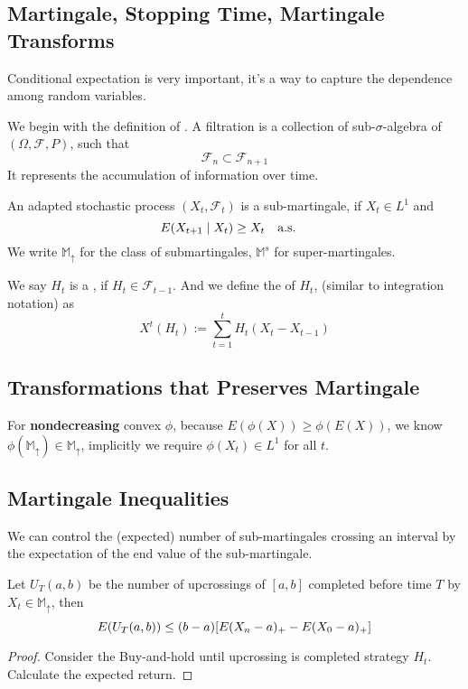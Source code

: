 \subsection{Martingale, Stopping Time, Martingale Transforms}

Conditional expectation is very important, it's a way to capture the dependence among random variables.

We begin with the definition of . A filtration is a collection of sub-\(\sigma\)-algebra of \((\Omega, \mathcal{F}, P)\), such that 
\begin{equation*}
    \mathcal{F}_{n} \subset \mathcal{F}_{n+1}
\end{equation*}
It represents the accumulation of information over time. 

\begin{defn}[Martingales]
    An adapted stochastic process \((X_{t}, \mathcal{F}_{t})\) is a sub-martingale, if \(X_{t} \in L^{1}\) and 
    \begin{equation*}
        E\pqty{X_{t+1}\mid X_{t}} \geq X_{t} \qq{a.s.}
    \end{equation*}
    We write \(\mathbb{M}_{\uparrow}\) for the class of submartingales, \(\mathbb{M}^{s}\) for super-martingales. 
\end{defn}

We say \(H_{t}\) is a , if \(H_{t} \in \mathcal{F}_{t-1}\). And we define the  of \(H_{t}\), (similar to integration notation) as 
\begin{equation*}
    X^{t}(H_{t}) := \sum_{t=1}^{t} H_{t}(X_{t} - X_{t-1})
\end{equation*}

\subsection{Transformations that Preserves Martingale}

For \textbf{nondecreasing} convex \(\phi\), because \(E(\phi(X)) \geq \phi(E(X))\), we know \(\phi(\mathbb{M}_{\uparrow}) \in \mathbb{M}_{\uparrow}\), implicitly we require \(\phi(X_{t}) \in L^{1}\) for all \(t\). 

\subsection{Martingale Inequalities}

We can control the (expected) number of sub-martingales crossing an interval by the expectation of the end value of the sub-martingale. 
\begin{lemma}
    Let \(U_{T}(a,b)\) be the number of upcrossings of \([a,b]\) completed before time \(T\) by \(X_{t} \in \mathbb{M}_{\uparrow}\), then 
    \begin{equation*}
        E(U_{T}(a,b)) \leq (b-a)\bqty{E(X_{n} - a)_{+} - E(X_{0} - a)_{+}}
    \end{equation*}
\end{lemma}
\begin{proof}
    Consider the Buy-and-hold until upcrossing is completed strategy \(H_{t}\). Calculate the expected return. 
\end{proof}

